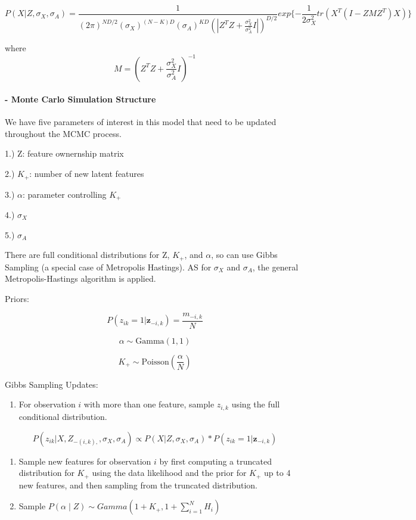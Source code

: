 \documentclass[11pt]{article}
\providecommand{\tightlist}{%
      \setlength{\itemsep}{0pt}\setlength{\parskip}{0pt}}
\begin{document}
\[P(X|Z,\sigma_X, \sigma_A) = \frac{1}{(2 \pi)^{ND/2} (\sigma_X)^{(N-K)D}(\sigma_A)^{KD}(|Z^TZ+\frac{\sigma_X^2}{\sigma_A^2}I|)^{D/2}} exp\{-\frac{1}{2\sigma_X^2}tr(X^T(I-Z M Z^T)X)\}\]

where \[ M = (Z^TZ+\frac{\sigma_X^2}{\sigma_A^2}I)^{-1}\]

    \hypertarget{monte-carlo-simulation-structure}{%
\paragraph{- Monte Carlo Simulation
Structure}\label{monte-carlo-simulation-structure}}

We have five parameters of interest in this model that need to be
updated throughout the MCMC process.

1.) Z: feature ownernship matrix

2.) \(K_+\): number of new latent features

3.) \(\alpha\): parameter controlling \(K_+\)

4.) \(\sigma_X\)

5.) \(\sigma_A\)

There are full conditional distributions for Z, \(K_+\), and \(\alpha\),
so can use Gibbs Sampling (a special case of Metropolis Hastings). AS
for \(\sigma_X\) and \(\sigma_A\), the general Metropolis-Hastings
algorithm is applied.

Priors:

\[P(z_{ik} = 1 | \textbf{z}_{-i,k}) = \dfrac{m_{-i,k}}{N} \]

\[\alpha \sim \text{Gamma}(1,1)\]

\[K_+ \sim \text{Poisson}(\dfrac{\alpha}{N})\]

Gibbs Sampling Updates:

\begin{enumerate}
\def\labelenumi{\arabic{enumi}.}
\tightlist
\item
  For observation \(i\) with more than one feature, sample \(z_{i,k}\)
  using the full conditional distribution.
\end{enumerate}

\[P(z_{ik}|X,Z_{-(i,k),},\sigma_X,\sigma_A) \propto  P(X|Z,\sigma_X, \sigma_A) * P(z_{ik}=1|\textbf{z}_{-i,k})\]

\begin{enumerate}
\def\labelenumi{\arabic{enumi}.}
\setcounter{enumi}{1}
\item
  Sample new features for observation \(i\) by first computing a
  truncated distribution for \(K_+\) using the data likelihood and the
  prior for \(K_+\) up to 4 new features, and then sampling from the
  truncated distribution.
\item
  Sample
  \(P(\alpha \mid Z) \sim Gamma(1 + K_+, 1 + \sum_{i=1}^{N} H_i)\)
\end{enumerate}
\end{document}
